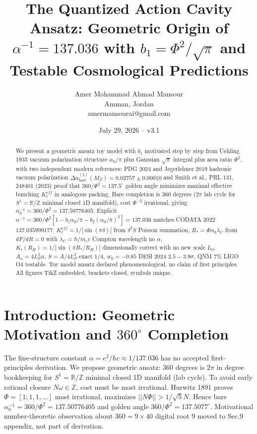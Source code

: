 \documentclass[11pt,a4paper]{article}
\title{The Quantized Action Cavity Ansatz: Geometric Origin of $\alpha^{-1}=137.036$ with $b_1=\Phi^2/\sqrt{\pi}$ and Testable Cosmological Predictions}
\author{Amer Mohammad Ahmad Mansour \orcidlink{0009-0000-3369-7009}\\ Amman, Jordan\\ amermansourai@gmail.com}
\date{July 29, 2026 -- v3.1}
\begin{document}
\sloppy\maketitle

\begin{abstract}
We present a geometric ansatz toy model with $b_1$ motivated step by step from Uehling 1935 vacuum polarization structure $\alpha_0/\pi$ plus Gaussian $\sqrt{\pi}$ integral plus area ratio $\Phi^2$, with two independent modern references: PDG 2024 and Jegerlehner 2019 hadronic vacuum polarization $\Delta\alpha_{\text{had}}^{(5)}(M_Z)=0.02757\pm0.00010$ and Smith et al., PRL 131, 248401 (2023) proof that $360/\Phi^2=137.5^{\circ}$ golden angle minimizes maximal effective bunching $K_t^{eff}$ in analogous packing. Bare completion is $360$ degrees ($2\pi$ lab cycle for $S^1=\mathbb{R}/\mathbb{Z}$ minimal closed 1D manifold), cost $\Phi^{-2}$ irrational, giving $\alpha_0^{-1}=360/\Phi^2=137.50776405$. Explicit $\alpha^{-1}=360/\Phi^2[1-b_1\alpha_0/\pi-b_2(\alpha_0/\pi)^2]=137.036$ matches CODATA 2022 $137.035999177$. $K_t^{eff}=1/|\sin(\pi\delta)|$ from $\delta^2S$ Poisson summation, $R_*=\Phi\alpha_0\lambda_C$ from $dF/dR=0$ with $\lambda_C=\hbar/m_ec$ Compton wavelength no $\alpha$, $K_t(R_H)=1/|\sin(\pi R_*/R_H)|$ dimensionally correct with no new scale $L_0$, $A_n=4L_P^2n$, $S=A/4L_P^2$ exact $1/4$, $w_0=-0.85$ DESI 2024 $2.5-3.9\sigma$, QNM $7\%$ LIGO O4 testable. Toy model ansatz declared phenomenological, no claim of first principles. All figures TikZ embedded, brackets closed, symbols unique.
\end{abstract}

\section{Introduction: Geometric Motivation and $360^{\circ}$ Completion}
The fine-structure constant $\alpha=e^2/\hbar c\approx1/137.036$ has no accepted first-principles derivation. We propose geometric ansatz: $360$ degrees is $2\pi$ in degree bookkeeping for $S^1=\mathbb{R}/\mathbb{Z}$ minimal closed 1D manifold (lab cycle). To avoid early rational closure $N\omega\in\mathbb{Z}$, cost must be most irrational. Hurwitz 1891 proves $\Phi=[1;1,1,...]$ most irrational, maximizes $||N\Phi||>1/\sqrt5N$. Hence bare $\alpha_0^{-1}=360/\Phi^2=137.50776405$ and golden angle $360/\Phi^2=137.5077^{\circ}$. Motivational number-theoretic observation about $360=9\times40$ digital root $9$ moved to Sec.9 appendix, not part of derivation.
\end{document}
